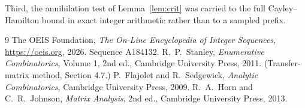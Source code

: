 \documentclass[11pt,a4paper]{article}
\theoremstyle{plain}
\theoremstyle{definition}
\begin{document}
Third, the annihilation test of Lemma~\ref{lem:crit} was carried to the full
Cayley--Hamilton bound in exact integer arithmetic rather than to a sampled prefix.

\begin{thebibliography}{9}
 The OEIS Foundation, \emph{The On-Line Encyclopedia of Integer
Sequences}, \url{https://oeis.org}, 2026. Sequence A184132.
 R.~P.~Stanley, \emph{Enumerative Combinatorics}, Volume 1, 2nd ed.,
Cambridge University Press, 2011. (Transfer-matrix method, Section 4.7.)
 P.~Flajolet and R.~Sedgewick, \emph{Analytic Combinatorics}, Cambridge
University Press, 2009.
 R.~A.~Horn and C.~R.~Johnson, \emph{Matrix Analysis}, 2nd ed., Cambridge
University Press, 2013.
\end{thebibliography}
\end{document}
